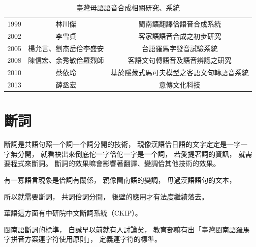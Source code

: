 \begin{table}
\caption{臺灣母語語音合成相關研究、系統}
\label{表：語音合成研究、系統}
\centering
\begin{tabular}{ccc}
1999 & 林川傑 & 閩南語翻譯佮語音合成系統\cite{中文到閩南語之線上翻譯及閩南語之語音合成} \\
2002 & 李雪貞 & 客家語語音合成之初步研究\cite{李雪貞2002客家語語音合成之初步研究} \\
2005 & 楊允言、劉杰岳佮李盛安 & 台語羅馬字發音試驗系統\cite{楊允言_台語羅馬字發音試驗系統} \\
2008 & 陳信宏、余秀敏佮羅烈師 & 客語文句轉語音及語音辨認之研究\cite{陳信宏2008客語文句轉語音及語音辨認之研究} \\
2010 & 蔡依玲 & 基於隱藏式馬可夫模型之客語文句轉語音系統\cite{蔡依玲2010基於隱藏式馬可夫模型之客語文句轉語音系統} \\
2013 & 薛丞宏 & 意傳文化科技\cite{意傳文化科技}
\end{tabular}
\end{table}

\section{斷詞}
\label{節：斷詞}
斷詞是共語句照一个詞一个詞分開的技術，
親像漢語佮日語的文字定定是一字一字無分開，
就看袂出來倒底佗一字佮佗一字是一个詞，
若愛提著詞的資訊，
就需要程式來斷詞。
斷詞的效果嘛會影響著翻譯、變調佮其他技術的效果。

有一寡語言現象是佮詞有關係，
親像閩南語的變調，
毋過漢語語句的文本，

所以就需要斷詞，
共詞佮詞分開，
後壁的應用才有法度繼續落去。





華語這方面有中研院中文斷詞系統（CKIP）\cite{CKIP論文}。

閩南語斷詞的標準，
自誠早以前就有人討論矣\cite{台語斷詞原則討論}，
教育部嘛有出「臺灣閩南語羅馬字拼音方案連字符使用原則」\cite{臺羅拼音}，
定義連字符的標準。





